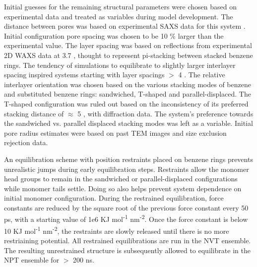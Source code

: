 
Initial guesses for the remaining structural parameters were chosen
based on experimental data and treated as variables during model
development. The distance between pores was based on experimental SAXS
data for this system \cite{feng_thin_2016}. Initial configuration pore
spacing was chosen to be 10 \% larger than the experimental value. 
The layer spacing was based on reflections from experimental 2D WAXS
data at 3.7 \angstrom, thought to represent pi-stacking between stacked
benzene rings\cite{feng_scalable_2014}. The tendency of simulations to
equilibrate to slightly larger interlayer spacing inspired systems
starting with layer spacings $>$ 4 \angstrom.
The relative interlayer orientation was chosen based on the various 
stacking modes of benzene and substituted benzene rings: sandwiched,
T-shaped and parallel-displaced. The T-shaped configuration was ruled
out based on the inconsistency of its preferred stacking distance of 
$\approx$ 5 \angstrom, with diffraction data. The system's preference
towards the sandwiched vs. parallel displaced stacking modes was left
as a variable. Initial pore radius estimates were based on past TEM 
images and size exclusion rejection data\cite{feng_scalable_2014,
feng_thin_2016,zhou_supported_2005}.    

An equilibration scheme with position restraints placed on benzene rings
prevents unrealistic jumps during early equilibration steps. Restraints
allow the monomer head groups to remain in the sandwiched or parallel-displaced 
configurations while monomer tails settle. Doing so also helps prevent
system dependence on initial monomer configuration. During the restrained
equilibration, force constants are reduced by the square root of the 
previous force constant every 50 ps, with a starting value of 1e6 KJ
mol\textsuperscript{-1} nm\textsuperscript{-2}. Once the force constant
is below 10 KJ mol\textsuperscript{-1} nm\textsuperscript{-2}, the 
restraints are slowly released until there is no more restriaining 
potential. All restrained equilibrations are run in the NVT ensemble. 
The resulting unrestrained structure is subsequently allowed to 
equilibrate in the NPT ensemble for $>$ 200 ns.  

